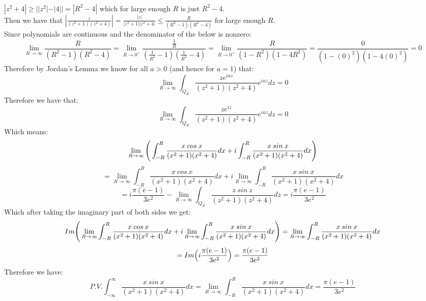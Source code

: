 \documentclass{article}
\begin{document}
\begin{center}
    \\$|z^2 + 4|\geq ||z^2| - |4|| = |R^2 - 4|$ which for large enough $R$ is just $R^2 - 4$.
    \\Then we have that $|\frac{z}{(z^2 + 1)(z^2 + 4)}| =\frac{|z|}{|z^2 + 1||z^2 + 4|}\leq\frac{R}{(R^2 - 1)(R^2 - 4)}$ for large enough $R$.
    \\Since polynomials are continuous and the denominator of the below is nonzero:
    \[\lim _{R\rightarrow\infty}\frac{R}{(R^2 - 1)(R^2 - 4)} =\lim _{R\rightarrow 0^+}\frac{\frac{1}{R}}{(\frac{1}{R^2} - 1)(\frac{1}{R^2} - 4)} =\lim _{R\rightarrow 0^+}\frac{R}{(1 - R^2)(1 - 4R^2)} =\frac{0}{(1 - (0)^2)(1 - 4(0)^2)} = 0\]
    Therefore by Jordan's Lemma we know for all $a > 0$ (and hence for $a = 1$) that:
    \[\lim _{R\rightarrow\infty}\int _{Q_R}\frac{ze^{iaz}}{(z^2 + 1)(z^2 + 4)} e^{iaz} dz = 0\]
    Therefore we have that:
    \[\lim _{R\rightarrow\infty}\int _{Q_R}\frac{ze^{iz}}{(z^2 + 1)(z^2 + 4)} e^{iaz} dz = 0\]
    Which means:
    \[\lim _{R\rightarrow\infty}\Bigg{(}\int _{-R}^R\frac{x\:cos\:x}{(x^2 + 1)(x^2 + 4)} dx + i\int _{-R}^R\frac{x\:sin\:x}{(x^2 + 1)(x^2 + 4)} dx\Bigg{)}\]
    \[=\lim _{R\rightarrow\infty}\int _{-R}^R\frac{x\:cos\:x}{(x^2 + 1)(x^2 + 4)} dx + i\lim _{R\rightarrow\infty}\int _{-R}^R\frac{x\:sin\:x}{(x^2 + 1)(x^2 + 4)} dx\]
    \[= i\frac{\pi (e - 1)}{3e^2} -\lim _{R\rightarrow\infty}\int _{Q_R}\frac{z\:sin\:z}{(z^2 + 1)(z^2 + 4)} dz = i\frac{\pi (e - 1)}{3e^2}\]
    Which after taking the imaginary part of both sides we get:
    \[Im\Bigg{(}\lim _{R\rightarrow\infty}\int _{-R}^R\frac{x\:cos\:x}{(x^2 + 1)(x^2 + 4)} dx + i\lim _{R\rightarrow\infty}\int _{-R}^R\frac{x\:sin\:x}{(x^2 + 1)(x^2 + 4)} dx\Bigg{)}=\lim _{R\rightarrow\infty}\int _{-R}^R\frac{x\:sin\:x}{(x^2 + 1)(x^2 + 4)} dx\]
    \[= Im\Big{(}i\frac{\pi (e - 1)}{3e^2}\Big{)} =\frac{\pi (e - 1)}{3e^2}\]
    Therefore we have:
    \[P.V.\int _{-\infty}^{\infty}\frac{x\:sin\:x}{(x^2 + 1)(x^2 + 4)} dx =\lim _{R\rightarrow\infty}\int _{-R}^R\frac{x\:sin\:x}{(x^2 + 1)(x^2 + 4)} dx =\frac{\pi (e - 1)}{3e^2}\]
\end{center}
\end{document}
